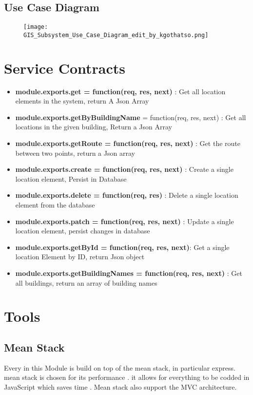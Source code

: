 \documentclass{article}
\begin{document}
	\subsection{Use Case Diagram}
		\begin{figure}[H]
			\texttt{[image: GIS\_Subsystem\_Use\_Case\_Diagram\_edit\_by\_kgothatso.png]}
		\end{figure}
	
\section{Service Contracts}
	
		\begin{itemize}
 			\item \textbf{module.exports.get = function(req, res, next)} : Get all location elements in the system, return A Json  Array
  			\item  \textbf{module.exports.getByBuildingName} = function(req, res, next) : Get all locations in the given building, Return a Json Array
  			\item \textbf{module.exports.getRoute = function(req, res, next)} : Get the route between two points, return a Json array
  			\item \textbf{module.exports.create = function(req, res, next)} : Create a single location element, Persist in Database
  			\item \textbf{module.exports.delete = function(req, res)} : Delete a single location element from the database
  			\item \textbf{module.exports.patch = function(req, res, next)} : Update a single location element, persist changes in database
  			\item \textbf{module.exports.getById = function(req, res, next)}: Get a single location Element by ID, return Json object
			\item \textbf{module.exports.getBuildingNames = function(req, res, next)} : Get all buildings, return an array of building names
		\end{itemize}
\section{Tools}
	\subsection{Mean Stack}
		Every in this Module is build on top of the mean stack, in particular express. mean stack is chosen for its performance 
		. it allows for everything to be codded in JavaScript which saves time . Mean stack also support the MVC architecture.
\end{document}

